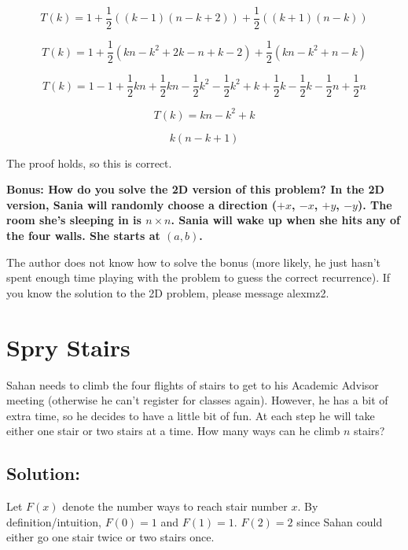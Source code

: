 \documentclass{article}
\begin{document}
\begin{enumerate}[label=(\alph*)]
    $$T(k) = 1 + \frac{1}{2}((k - 1)(n - k + 2)) + \frac{1}{2}((k + 1)(n - k))$$

    $$T(k) = 1 + \frac{1}{2}(kn - k^2 + 2k - n + k - 2) + \frac{1}{2}(kn - k^2 + n - k)$$

    $$T(k) = 1 - 1 + \frac{1}{2}kn + \frac{1}{2}kn - \frac{1}{2}k^2 - \frac{1}{2}k^2 + k + \frac{1}{2}k - \frac{1}{2}k - \frac{1}{2}n + \frac{1}{2}n$$

    $$T(k) = kn - k^2 + k$$

    $$\boxed{k(n - k + 1)}$$
    
    The proof holds, so this is correct.

\end{enumerate}

\vspace{2cm}

\textbf{Bonus: How do you solve the 2D version of this problem? In the 2D version, Sania will randomly choose a direction ($+x$, $-x$, $+y$, $-y$). The room she's sleeping in is $n \times n$. Sania will wake up when she hits any of the four walls. She starts at $(a, b)$.}

The author does not know how to solve the bonus (more likely, he just hasn't spent enough time playing with the problem to guess the correct recurrence). If you know the solution to the 2D problem, please message alexmz2.

\vspace{5cm}



\newpage

\section{Spry Stairs}

Sahan needs to climb the four flights of stairs to get to his Academic Advisor meeting (otherwise he can't register for classes again). However, he has a bit of extra time, so he decides to have a little bit of fun. At each step he will take either one stair or two stairs at a time. How many ways can he climb $n$ stairs?

\subsection{Solution:}

Let $F(x)$ denote the number ways to reach stair number $x$. By definition/intuition, $F(0) = 1$ and $F(1) = 1$. $F(2) = 2$ since Sahan could either go one stair twice or two stairs once.
\end{document}
